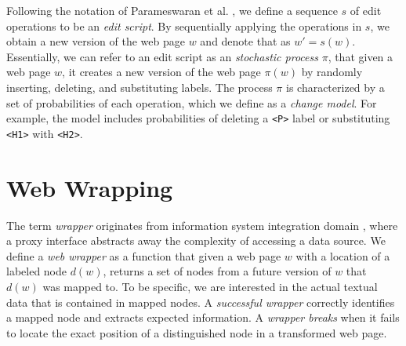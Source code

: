 Following the notation of Parameswaran et al. \cite{DBLP:journals/pvldb/ParameswaranDGR11}, we define a sequence $s$ of edit operations to be an \emph{edit script}. By sequentially applying the operations in $s$, we obtain a new version of the web page $w$ and denote that as $w' = s(w)$. Essentially, we can refer to an edit script as an \emph{stochastic process} $\pi$, that given a web page $w$, it creates a new version of the web page $\pi(w)$ by randomly inserting, deleting, and substituting labels. The process $\pi$ is characterized by a set of probabilities of each operation, which we define as a \emph{change model}. For example, the model includes probabilities of deleting a \texttt{<P>} label or substituting \texttt{<H1>} with \texttt{<H2>}.


\section{Web Wrapping}

The term \emph{wrapper} originates from information system integration domain \cite{Chang:2006:SWI:1159162.1159300}, where a proxy interface abstracts away the complexity of accessing a data source. We define a \emph{web wrapper} as a function that given a web page $w$ with a location of a labeled node $d(w)$, returns a set of nodes from a future version of $w$ that $d(w)$ was mapped to. To be specific, we are interested in the actual textual data that is contained in mapped nodes. A \emph{successful wrapper} correctly identifies a mapped node and extracts expected information. A \emph{wrapper breaks} when it fails to locate the exact position of a distinguished node in a transformed web page.


